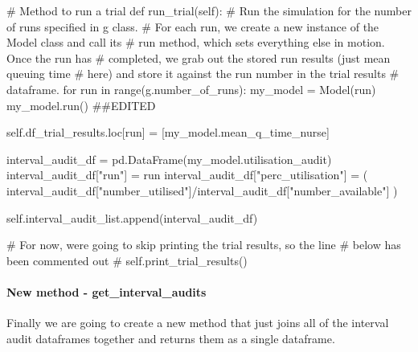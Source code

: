 \documentclass[
  letterpaper,
  DIV=11,
  numbers=noendperiod]{scrreprt}
\let\oldparagraph\paragraph
\renewcommand{\paragraph}[1]{\oldparagraph{#1}\mbox{}}
\newenvironment{Shaded}{}{}
\newcommand{\BuiltInTok}[1]{\textcolor[rgb]{0.84,0.23,0.29}{#1}}
\newcommand{\CommentTok}[1]{\textcolor[rgb]{0.42,0.45,0.49}{#1}}
\newcommand{\ControlFlowTok}[1]{\textcolor[rgb]{0.84,0.23,0.29}{#1}}
\newcommand{\KeywordTok}[1]{\textcolor[rgb]{0.84,0.23,0.29}{#1}}
\newcommand{\NormalTok}[1]{\textcolor[rgb]{0.14,0.16,0.18}{#1}}
\newcommand{\OperatorTok}[1]{\textcolor[rgb]{0.14,0.16,0.18}{#1}}
\newcommand{\StringTok}[1]{\textcolor[rgb]{0.01,0.18,0.38}{#1}}
\newcommand{\VariableTok}[1]{\textcolor[rgb]{0.89,0.38,0.04}{#1}}
\begin{document}
\begin{Shaded}
\begin{Highlighting}[]
\CommentTok{\# Method to run a trial}
\KeywordTok{def}\NormalTok{ run\_trial(}\VariableTok{self}\NormalTok{):}
        \CommentTok{\# Run the simulation for the number of runs specified in g class.}
        \CommentTok{\# For each run, we create a new instance of the Model class and call its}
        \CommentTok{\# run method, which sets everything else in motion.  Once the run has}
        \CommentTok{\# completed, we grab out the stored run results (just mean queuing time}
        \CommentTok{\# here) and store it against the run number in the trial results}
        \CommentTok{\# dataframe.}
        \ControlFlowTok{for}\NormalTok{ run }\KeywordTok{in} \BuiltInTok{range}\NormalTok{(g.number\_of\_runs):}
\NormalTok{            my\_model }\OperatorTok{=}\NormalTok{ Model(run)}
\NormalTok{            my\_model.run() }\CommentTok{\#\#EDITED}

            \VariableTok{self}\NormalTok{.df\_trial\_results.loc[run] }\OperatorTok{=}\NormalTok{ [my\_model.mean\_q\_time\_nurse]}

\NormalTok{            interval\_audit\_df }\OperatorTok{=}\NormalTok{ pd.DataFrame(my\_model.utilisation\_audit)}
\NormalTok{            interval\_audit\_df[}\StringTok{"run"}\NormalTok{] }\OperatorTok{=}\NormalTok{ run}
\NormalTok{            interval\_audit\_df[}\StringTok{"perc\_utilisation"}\NormalTok{] }\OperatorTok{=}\NormalTok{ (}
\NormalTok{              interval\_audit\_df[}\StringTok{"number\_utilised"}\NormalTok{]}\OperatorTok{/}\NormalTok{interval\_audit\_df[}\StringTok{"number\_available"}\NormalTok{]}
\NormalTok{            )}

            \VariableTok{self}\NormalTok{.interval\_audit\_list.append(interval\_audit\_df)}

        \CommentTok{\# For now, we\textquotesingle{}re going to skip printing the trial results, so the line}
        \CommentTok{\# below has been commented out}
        \CommentTok{\# self.print\_trial\_results()}
\end{Highlighting}
\end{Shaded}

\paragraph{New method -
get\_interval\_audits}\label{new-method---get_interval_audits}

Finally we are going to create a new method that just joins all of the
interval audit dataframes together and returns them as a single
dataframe.
\end{document}
